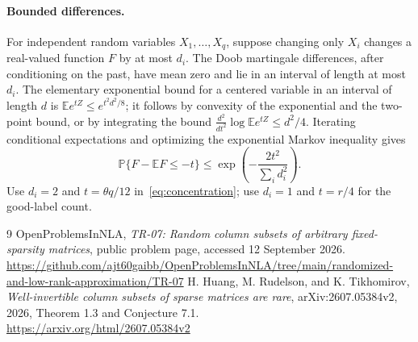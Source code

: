 \documentclass[11pt]{article}
\theoremstyle{remark}\newtheorem{remark}[theorem]{Remark}
\newcommand{\E}{\mathbb E}\newcommand{\PP}{\mathbb P}
\begin{document}
\paragraph{Bounded differences.}
For independent random variables $X_1,\ldots,X_q$, suppose changing only $X_i$ changes a real-valued function $F$ by at most $d_i$. The Doob martingale differences, after conditioning on the past, have mean zero and lie in an interval of length at most $d_i$. The elementary exponential bound for a centered variable in an interval of length $d$ is $\E e^{tZ}\le e^{t^2d^2/8}$; it follows by convexity of the exponential and the two-point bound, or by integrating the bound $\frac{d^2}{dt^2}\log\E e^{tZ}\le d^2/4$. Iterating conditional expectations and optimizing the exponential Markov inequality gives
\[
 \PP\{F-\E F\le-t\}\le
 \exp\left(-\frac{2t^2}{\sum_i d_i^2}\right).
\]
Use $d_i=2$ and $t=\theta q/12$ in~\eqref{eq:concentration}; use $d_i=1$ and $t=r/4$ for the good-label count.

\begin{thebibliography}{9}
 OpenProblemsInNLA, \emph{TR-07: Random column subsets of arbitrary fixed-sparsity matrices}, public problem page, accessed 12 September 2026.\\
\url{https://github.com/ajt60gaibb/OpenProblemsInNLA/tree/main/randomized-and-low-rank-approximation/TR-07}
 H. Huang, M. Rudelson, and K. Tikhomirov, \emph{Well-invertible column subsets of sparse matrices are rare}, arXiv:2607.05384v2, 2026, Theorem 1.3 and Conjecture 7.1.\\
\url{https://arxiv.org/html/2607.05384v2}
\end{thebibliography}
\end{document}
